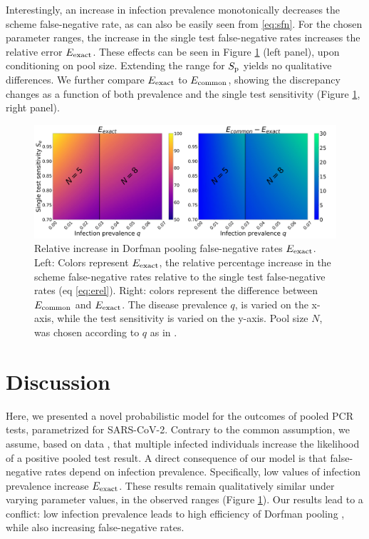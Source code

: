 \documentclass{article}
\begin{document}
Interestingly, an increase in infection prevalence monotonically
decreases the scheme false-negative rate, as can also be easily seen
from \eqref{eq:sfn}. For the chosen parameter ranges, the increase in
the single test false-negative rates increases the relative error
$E_{\text{{exact}}}$. These effects can be seen in Figure \ref{fig1} (left
panel), upon conditioning on pool size. Extending the range for $S_\text{p}$
yields no qualitative differences. We further compare $E_{\text{{exact}}}$ to
$E_{\text{{common}}}$, showing the discrepancy changes as a function of both
prevalence and the single test sensitivity (Figure \ref{fig1}, right
panel).
\begin{figure}[H]
  \centering
  \includegraphics[width=\textwidth]{heatmap_sfn.jpg}
  \caption{Relative increase in Dorfman pooling false-negative rates
    $E_{\text{{exact}}}$. Left: Colors represent $E_{\text{{exact}}}$, the relative
    percentage increase in the scheme false-negative rates relative
    to the single test false-negative rates (eq
    \eqref{eq:erel}). Right: colors represent the difference between
    $E_{\text{{common}}}$ and $E_{\text{{exact}}}$. The disease prevalence $q$, is
    varied on the x-axis, while the test sensitivity is varied on
    the y-axis. Pool size $N$, was chosen according to $q$ as in
    \cite{DorfmanYuvalDor}.}\label{fig1}
\end{figure}

\section*{Discussion}
Here, we presented a novel probabilistic model for the outcomes of
pooled PCR tests, parametrized for SARS-CoV-2. Contrary to the common
assumption, we assume, based on data \cite{Salazar}, that multiple
infected individuals increase the likelihood of a positive pooled test
result. A direct consequence of our model is that false-negative rates
depend on infection prevalence. Specifically, low values of infection
prevalence increase $E_{\text{{exact}}}$. These results remain qualitatively
similar under varying parameter values, in the observed ranges
\cite{KitComparison,EstimatingRatesKucrika, EstimatingRatesLourenco,
  InterpretingCOVID19Test} (Figure \ref{fig1}).
Our results lead to a conflict: low infection prevalence leads to high
efficiency of Dorfman pooling \cite{DorfmanYuvalDor}, while also
increasing false-negative rates. 
\end{document}
